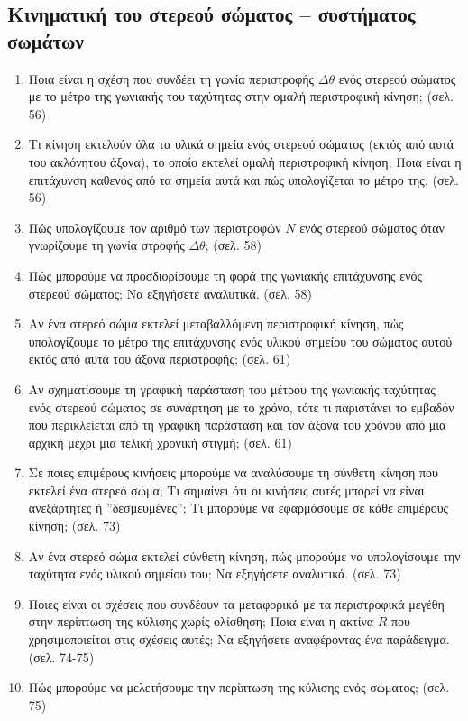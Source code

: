 \documentclass{article}
\begin{document}
\subsection{Κινηματική του στερεού σώματος -- συστήματος σωμάτων}

\begin{enumerate}
      \item Ποια είναι η σχέση που συνδέει τη γωνία περιστροφής $\Delta\theta$ ενός στερεού σώματος με το μέτρο της γωνιακής του ταχύτητας στην ομαλή περιστροφική κίνηση; (σελ. 56)
      \item Τι κίνηση εκτελούν όλα τα υλικά σημεία ενός στερεού σώματος (εκτός από αυτά του ακλόνητου άξονα), το οποίο εκτελεί ομαλή περιστροφική κίνηση; Ποια είναι η επιτάχυνση καθενός από τα σημεία αυτά και πώς υπολογίζεται το μέτρο της; (σελ. 56)
      \item Πώς υπολογίζουμε τον αριθμό των περιστροφών $N$ ενός στερεού σώματος όταν γνωρίζουμε τη γωνία στροφής $\Delta\theta$; (σελ. 58)
      \item Πώς μπορούμε να προσδιορίσουμε τη φορά της γωνιακής επιτάχυνσης ενός στερεού σώματος; Να εξηγήσετε αναλυτικά. (σελ. 58)
      \item Αν ένα στερεό σώμα εκτελεί μεταβαλλόμενη περιστροφική κίνηση, πώς υπολογίζουμε το μέτρο της επιτάχυνσης ενός υλικού σημείου του σώματος αυτού εκτός από αυτά του άξονα περιστροφής; (σελ. 61)
      \item Αν σχηματίσουμε τη γραφική παράσταση του μέτρου της γωνιακής ταχύτητας ενός στερεού σώματος σε συνάρτηση με το χρόνο, τότε τι παριστάνει το εμβαδόν που περικλείεται από τη γραφική παράσταση και τον άξονα του χρόνου από μια αρχική μέχρι μια τελική χρονική στιγμή; (σελ. 61)
      \item Σε ποιες επιμέρους κινήσεις μπορούμε να αναλύσουμε τη σύνθετη κίνηση που εκτελεί ένα στερεό σώμα; Τι σημαίνει ότι οι κινήσεις αυτές μπορεί να είναι ανεξάρτητες ή ''δεσμευμένες''; Τι μπορούμε να εφαρμόσουμε σε κάθε επιμέρους κίνηση; (σελ. 73)
      \item Αν ένα στερεό σώμα εκτελεί σύνθετη κίνηση, πώς μπορούμε να υπολογίσουμε την ταχύτητα ενός υλικού σημείου του; Να εξηγήσετε αναλυτικά. (σελ. 73)
      \item Ποιες είναι οι σχέσεις που συνδέουν τα μεταφορικά με τα περιστροφικά μεγέθη στην περίπτωση της κύλισης χωρίς ολίσθηση; Ποια είναι η ακτίνα $R$ που χρησιμοποιείται στις σχέσεις αυτές; Να εξηγήσετε αναφέροντας ένα παράδειγμα. (σελ. 74-75)
      \item Πώς μπορούμε να μελετήσουμε την περίπτωση της κύλισης ενός σώματος; (σελ. 75)

\end{enumerate}
\end{document}
